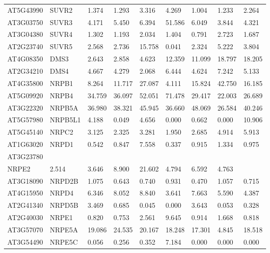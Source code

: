 \begin{landscape}
\begin{longtable}{l|l|llll|lll}
AT5G43990 & SUVR2    & 1.374  & 1.293  & 3.316  & 4.269   & 1.004  & 1.233  & 2.264  \\
AT3G03750 & SUVR3    & 4.171  & 5.450  & 6.394  & 51.586  & 6.049  & 3.844  & 4.321  \\
AT3G04380 & SUVR4    & 1.302  & 1.193  & 2.034  & 1.404   & 0.791  & 2.723  & 1.687  \\
AT2G23740 & SUVR5    & 2.568  & 2.736  & 15.758 & 0.041   & 2.324  & 5.222  & 3.804  \\ \hline
AT4G08350 & DMS3     & 2.643  & 2.858  & 4.623  & 12.359  & 11.099 & 18.797 & 18.205 \\
AT2G34210 & DMS4     & 4.667  & 4.279  & 2.068  & 6.444   & 4.624  & 7.242  & 5.133  \\ \hline
AT4G35800 & NRPB1    & 8.264  & 11.717 & 27.087 & 4.111   & 15.824 & 42.750 & 16.185 \\
AT5G09920 & NRPB4    & 34.759 & 36.097 & 52.051 & 71.478  & 29.417 & 22.003 & 26.689 \\
AT3G22320 & NRPB5A                                                 & 36.980   & 38.321  & 45.945    & 36.660 & 48.069      & 26.584    & 40.246    \\
AT5G57980 & NRPB5L1  & 4.188  & 0.049  & 4.656  & 0.000   & 0.662  & 0.000  & 10.906 \\
AT5G45140 & NRPC2    & 3.125  & 2.325  & 3.281  & 1.950   & 2.685  & 4.914  & 5.913  \\
AT1G63020 & NRPD1    & 0.542  & 0.847  & 7.558  & 0.337   & 0.915  & 1.334  & 0.975  \\
AT3G23780 & \begin{tabular}[c]{@{}l@{}}NRPD2/\\ NRPE2\end{tabular} & 2.514    & 3.646   & 8.900     & 21.602 & 4.794       & 6.592     & 4.763     \\
AT3G18090 & NRPD2B   & 1.075  & 0.643  & 0.740  & 0.931   & 0.470  & 1.057  & 0.715  \\
AT4G15950 & NRPD4    & 6.346  & 8.052  & 8.840  & 3.641   & 7.663  & 5.590  & 4.387  \\
AT2G41340 & NRPD5B   & 3.469  & 0.685  & 0.045  & 0.000   & 3.643  & 0.053  & 0.328  \\
AT2G40030 & NRPE1    & 0.820  & 0.753  & 2.561  & 9.645   & 0.914  & 1.668  & 0.818  \\
AT3G57070 & NRPE5A   & 19.086 & 24.535 & 20.167 & 18.248  & 17.301 & 4.845  & 18.518 \\
AT3G54490 & NRPE5C   & 0.056  & 0.256  & 0.352  & 7.184   & 0.000  & 0.000  & 0.000  \\

\end{longtable}
\end{landscape}
